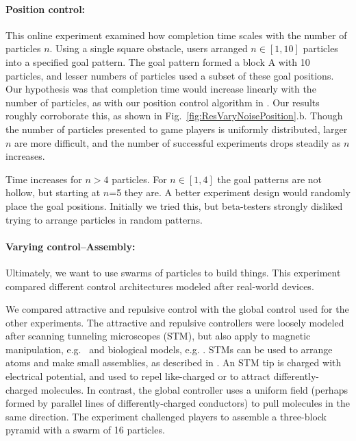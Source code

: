 \paragraph{Position control:}
This online experiment examined how completion time scales with the number of particles $n$. Using a single square obstacle, users arranged $n\in[1,10]$ particles into a specified goal pattern.  The goal pattern formed a block  {\sffamily A} with 10 particles, and lesser numbers of particles used a subset of these goal positions. Our hypothesis was that completion time would increase linearly with the number of particles, as with our position control algorithm in \cite{Becker2013b}.  Our results roughly corroborate this, as shown in Fig.~\ref{fig:ResVaryNoisePosition}.b.  Though the number of particles presented to game players is uniformly distributed, larger $n$ are more difficult, and the number of successful experiments drops steadily as $n$ increases.



Time increases for $n>4$ particles. For $n\in[1,4]$ the goal patterns are not hollow, but starting at $n$=5 they are.  A better experiment design would randomly place the goal positions.  Initially we tried this, but beta-testers strongly disliked trying to arrange particles in random patterns.


\paragraph{Varying control--Assembly:}
Ultimately, we want to use swarms of particles to build things. This experiment compared different control architectures modeled after real-world devices.

We compared attractive and repulsive control with the global control used for the other experiments. The attractive and repulsive controllers were loosely modeled after scanning tunneling microscopes (STM), but also apply to magnetic manipulation, e.g.\ \cite{Khalil2013} and biological models, e.g. \cite{goodrich2012types}. STMs can be used to arrange atoms and make small assemblies, as described in \cite{avouris1995manipulation}. An STM tip is charged with electrical potential, and used to repel like-charged or to attract differently-charged molecules. In contrast, the global controller uses a uniform field (perhaps formed by parallel lines of differently-charged conductors) to pull molecules in the same direction.
The experiment challenged players to assemble a three-block pyramid with a swarm of 16 particles.

